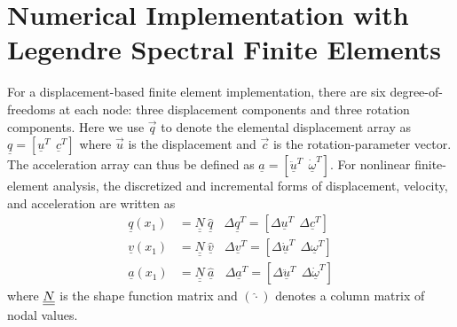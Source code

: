 \section{Numerical Implementation with Legendre Spectral Finite Elements}
\label{sec:NumImp}
For a displacement-based finite element implementation, there are six
degree-of-freedoms at each node: three displacement components and three
rotation components. Here we use $\vec{q}$ to denote the elemental
displacement array as $\underline{q}=\left[
\underline{u}^T~~\underline{c}^T\right]$ where $\vec{u}$ is the
displacement and $\vec{c}$ is the rotation-parameter vector. The
acceleration array can thus be defined as $\underline{a}=\left[
\ddot{\underline{u}}^T~~ \dot{\underline{\omega}}^T \right]$. For nonlinear
finite-element analysis, the discretized and incremental forms of
displacement, velocity, and acceleration are written as
\begin{align}
	\label{Discretized}
	\underline{q} (x_1) &= \underline{\underline{N}} ~\hat{\underline{q}}~~~~\Delta \underline{q}^T = \left[ \Delta \underline{u}^T~~\Delta \underline{c}^T \right] \\
	\underline{v}(x_1) &= \underline{\underline{N}}~\hat{\underline{v}}~~~~\Delta \underline{v}^T = \left[\Delta \underline{\dot{u}}^T~~\Delta \underline{\omega}^T \right] \\
	\underline{a}(x_1) &= \underline{\underline{N}}~ \hat{\underline{a}}~~~~\Delta \underline{a}^T = \left[ \Delta \ddot{\underline{u}}^T~~\Delta \dot{\underline{\omega}}^T \right]	
\end{align}
where $\underline{\underline{N}}$ is the shape function matrix and $(\hat{\cdot})$ denotes a
column matrix of nodal values. 

